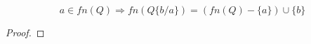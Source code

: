 \begin{lemma}\label{freenamesandsubstitution}
  \[
    a\in fn(Q)\Rightarrow fn(Q\{b/a\})=(fn(Q)-\{a\}) \cup \{b\}
  \]
  \begin{proof}
%     
%     

\end{proof}
\end{lemma}
